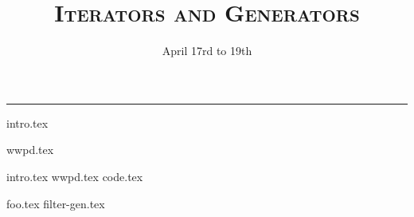 \documentclass{exam}
\title{\textsc{Iterators and Generators}}
\date{April 17rd to 19th}
\begin{document}
\maketitle
\rule{\textwidth}{0.15em}
\fontsize{12}{15}\selectfont

{intro.tex}
\begin{questions}
{wwpd.tex}

\newpage

{intro.tex}
\newpage
{wwpd.tex}
{code.tex}

\newpage
{foo.tex}
\newpage
{filter-gen.tex}

\end{questions}
\end{document}
